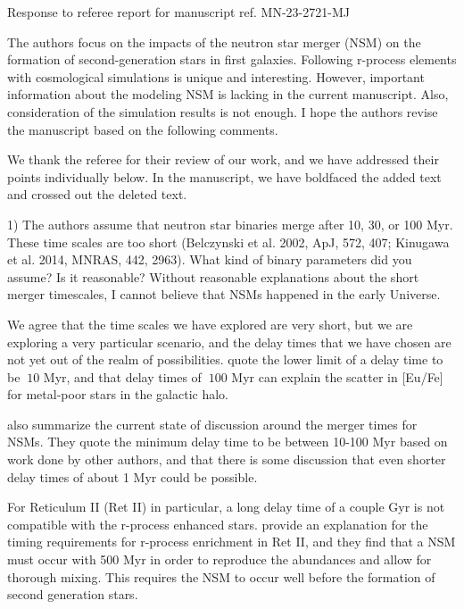 \documentclass[11pt]{article}
\begin{document}
\begin{center} 
\bfseries{
\begin{large}
  Response to referee report for manuscript ref. MN-23-2721-MJ
\end{large}
}
\end{center}

\begin{tcolorbox}[colback={lightgray}]
    The authors focus on the impacts of the neutron star merger (NSM) on the formation of second-generation stars in first galaxies. Following r-process elements with cosmological simulations is unique and interesting. However, important information about the modeling NSM is lacking in the current manuscript. Also, consideration of the simulation results is not enough. I hope the authors revise the manuscript based on the following comments.
\end{tcolorbox}

We thank the referee for their review of our work, and we have
addressed their points individually below.  In the manuscript, we have
boldfaced the added text and crossed out the deleted text.  

\begin{tcolorbox}[colback={lightgray}]
    1)      The authors assume that neutron star binaries merge after 10, 30, or 100 Myr. These time scales are too short (Belczynski et al. 2002, ApJ, 572, 407; Kinugawa et al. 2014, MNRAS, 442, 2963). What kind of binary parameters did you assume? Is it reasonable? Without reasonable explanations about the short merger timescales, I cannot believe that NSMs happened in the early Universe.
\end{tcolorbox}

We agree that the time scales we have explored are very short, but we are exploring a very particular scenario, and the delay times that we have chosen are not yet out of the realm of possibilities. \citet{Hirai15} quote the lower limit of a delay time to be $~10$ Myr, and that delay times of $~100$ Myr can explain the scatter in [Eu/Fe] for metal-poor stars in the galactic halo. 

\citet{Frebel23} also summarize the current state of discussion around the merger times for NSMs. They quote the minimum delay time to be between 10-100 Myr based on work done by other authors, and that there is some discussion that even shorter delay times of about 1 Myr could be possible.

For Reticulum II (Ret II) in particular, a long delay time of a couple Gyr is not compatible with the r-process enhanced stars. \citet{Simon23} provide an explanation for the timing requirements for r-process enrichment in Ret II, and they find that a NSM must occur with 500 Myr in order to reproduce the abundances and allow for thorough mixing. This requires the NSM to occur well before the formation of second generation stars.
\end{document}

